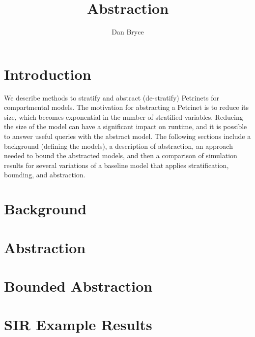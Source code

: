 \documentclass[10pt,letterpaper]{article}
\title{\funman Abstraction}
\author{Dan Bryce}
\begin{document}
\maketitle

\section{Introduction}

We describe methods to stratify and abstract (de-stratify) Petrinets for compartmental models.  The motivation for abstracting a Petrinet is to reduce its size, which becomes exponential in the number of stratified variables.  Reducing the size of the model can have a significant impact on runtime, and it is possible to answer useful queries with the abstract model.  The following sections include a background (defining the models), a description of abstraction, an approach needed to bound the abstracted models, and then a comparison of simulation results for several variations of a baseline model that applies stratification, bounding, and abstraction.

\section{Background}


\section{Abstraction}


\section{Bounded Abstraction}


\section{SIR Example Results}


% 

\end{document}
